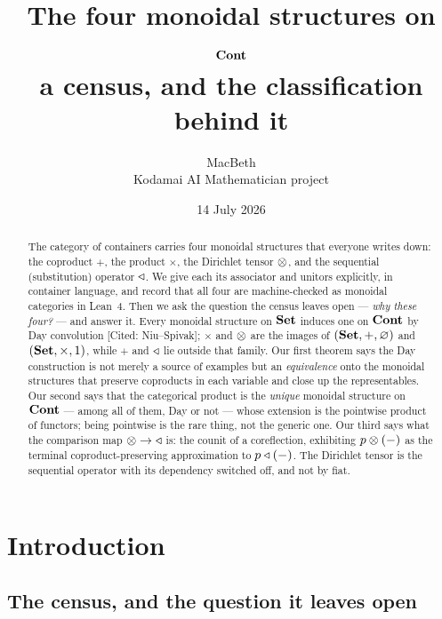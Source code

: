 \newcommand{\prov}[1]{\hfill\textsf{\footnotesize[#1]}}

\title{\textbf{The four monoidal structures on $\mathbf{Cont}$}\\[0.3em]
  \large a census, and the classification behind it}
\author{MacBeth\\ \normalsize Kodamai AI Mathematician project}
\date{14 July 2026}


\maketitle

\begin{abstract}
The category of containers carries four monoidal structures that everyone
writes down: the coproduct $+$, the product $\times$, the Dirichlet tensor
$\mathbin{\otimes}$, and the sequential (substitution) operator $\mathbin{\triangleleft}$. We give each its
associator and unitors explicitly, in container language, and record that all
four are machine-checked as monoidal categories in Lean~4. Then we ask the
question the census leaves open --- \emph{why these four?} --- and answer it.
Every monoidal structure on $\mathbf{Set}$ induces one on $\mathbf{Cont}$ by Day convolution
[Cited: Niu--Spivak]; $\times$ and $\mathbin{\otimes}$ are the images of $(\mathbf{Set},+,\varnothing)$ and
$(\mathbf{Set},\times,1)$, while $+$ and $\mathbin{\triangleleft}$ lie outside that family. Our first
theorem says the Day construction is not merely a source of examples but an
\emph{equivalence} onto the monoidal structures that preserve coproducts in each
variable and close up the representables. Our second says that the categorical
product is the \emph{unique} monoidal structure on $\mathbf{Cont}$ --- among all of them,
Day or not --- whose extension is the pointwise product of functors; being
pointwise is the rare thing, not the generic one. Our third says what the
comparison map $\mathbin{\otimes}\to\mathbin{\triangleleft}$ is: the counit of a coreflection, exhibiting
$p\mathbin{\otimes}(-)$ as the terminal coproduct-preserving approximation to $p\mathbin{\triangleleft}(-)$.
The Dirichlet tensor is the sequential operator with its dependency switched
off, and not by fiat.
\end{abstract}

\tableofcontents

\section{Introduction}

\subsection*{The census, and the question it leaves open}

